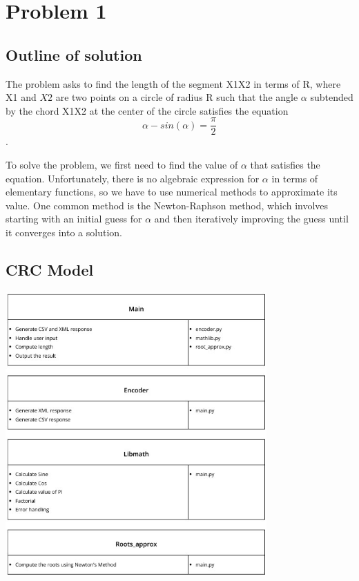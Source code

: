 \chapter{Problem 1}
\section{Outline of solution}

The problem asks to find the length of the segment X1X2 in terms of R, where X1 and $X2$ are two points on a circle of radius R such that the 
angle $\alpha$ subtended by the chord X1X2 at the center of the circle satisfies the equation 
$$\alpha - sin(\alpha) =\frac{\pi}{2}$$.

\noindent To solve the problem, we first need to find the value of $\alpha$ that satisfies the equation. Unfortunately, there is no algebraic expression for $\alpha$ in terms of elementary functions, so we have to use numerical methods to approximate its value. One common method is the Newton-Raphson method, which involves starting with an initial guess for $\alpha$ and then iteratively improving the guess until it converges into a solution.


\section{CRC Model}
    \begin{center}
        \includegraphics[width=10cm]{images/CRC_D1_Updated.jpg}
    \end{center}